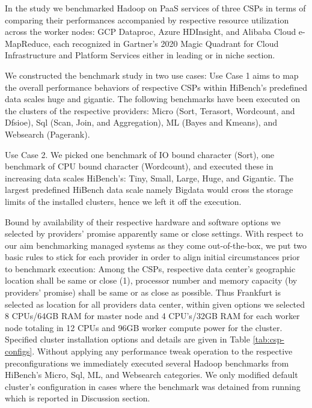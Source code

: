 \documentclass[review]{elsarticle}
\begin{document}
In the study we benchmarked Hadoop on PaaS services of three CSPs in terms of comparing their performances accompanied by respective resource utilization across the worker nodes: GCP Dataproc, Azure HDInsight, and Alibaba Cloud e-MapReduce, each recognized in Gartner's 2020 Magic Quadrant for Cloud Infrastructure and Platform Services \cite{noauthor_gartner_nodate} either in leading or in niche section.

We constructed the benchmark study in two use cases: Use Case 1 aims to map the overall performance behaviors of respective CSPs within HiBench's predefined data scales huge and gigantic. The following benchmarks have been executed on the clusters of the respective providers: Micro (Sort, Terasort, Wordcount, and Dfsioe), Sql (Scan, Join, and Aggregation), ML (Bayes and Kmeans), and Websearch (Pagerank).

Use Case 2. We picked one benchmark of IO bound character (Sort), one benchmark of CPU bound character (Wordcount), and executed these in increasing data scales HiBench's: Tiny, Small, Large, Huge, and Gigantic. The largest predefined HiBench data scale namely Bigdata would cross the storage limits of the installed clusters, hence we left it off the execution. 

Bound by availability of their respective hardware and software options we selected by providers' promise apparently same or close settings. With respect to our aim benchmarking managed systems as they come out-of-the-box, we put two basic rules to stick for each provider in order to align initial circumstances prior to benchmark execution: Among the CSPs, respective  data center's geographic location shall be same or close (1), processor number and memory capacity (by providers' promise) shall be same or as close as possible. Thus Frankfurt is selected as location for all providers data center, within given options we selected 8 CPUs/64GB RAM for master node and 4 CPU's/32GB RAM for each worker node totaling in 12 CPUs and 96GB worker compute power for the cluster. Specified cluster installation options and details are given in Table \ref{tab:csp-configs}. Without applying any performance tweak operation to the respective preconfigurations we immediately executed several Hadoop benchmarks from HiBench's Micro, Sql, ML, and Websearch categories. We only modified default cluster's configuration in cases where the benchmark was detained from running which is reported in Discussion section.
\end{document}
